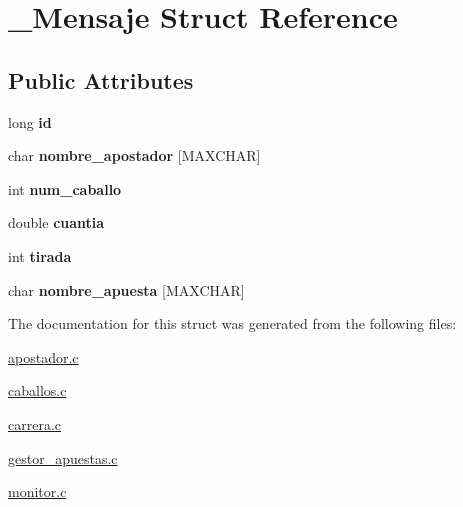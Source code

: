\hypertarget{struct__Mensaje}{}\section{\+\_\+\+Mensaje Struct Reference}
\label{struct__Mensaje}
\subsection*{Public Attributes}
\begin{DoxyCompactItemize}
\item 
long {\bfseries id}\hypertarget{struct__Mensaje_a216a370cde3eae04df6a81fea5bef338}{}\label{struct__Mensaje_a216a370cde3eae04df6a81fea5bef338}

\item 
char {\bfseries nombre\+\_\+apostador} \mbox{[}M\+A\+X\+C\+H\+AR\mbox{]}\hypertarget{struct__Mensaje_a2015260e47655295b99bae94fc88eefc}{}\label{struct__Mensaje_a2015260e47655295b99bae94fc88eefc}

\item 
int {\bfseries num\+\_\+caballo}\hypertarget{struct__Mensaje_a8e2b9b2de889202bb93247efe62174b8}{}\label{struct__Mensaje_a8e2b9b2de889202bb93247efe62174b8}

\item 
double {\bfseries cuantia}\hypertarget{struct__Mensaje_a22b9bc48089b86fb2c9272545d4b8273}{}\label{struct__Mensaje_a22b9bc48089b86fb2c9272545d4b8273}

\item 
int {\bfseries tirada}\hypertarget{struct__Mensaje_af4ec3ed51564e6fe198fd79367e6fffe}{}\label{struct__Mensaje_af4ec3ed51564e6fe198fd79367e6fffe}

\item 
char {\bfseries nombre\+\_\+apuesta} \mbox{[}M\+A\+X\+C\+H\+AR\mbox{]}\hypertarget{struct__Mensaje_acf51afcd3281d8459017de9ec2d23f17}{}\label{struct__Mensaje_acf51afcd3281d8459017de9ec2d23f17}

\end{DoxyCompactItemize}


The documentation for this struct was generated from the following files\+:\begin{DoxyCompactItemize}
\item 
\hyperlink{apostador_8c}{apostador.\+c}\item 
\hyperlink{caballos_8c}{caballos.\+c}\item 
\hyperlink{carrera_8c}{carrera.\+c}\item 
\hyperlink{gestor__apuestas_8c}{gestor\+\_\+apuestas.\+c}\item 
\hyperlink{monitor_8c}{monitor.\+c}\end{DoxyCompactItemize}

